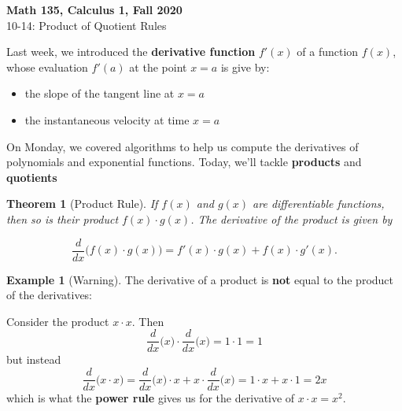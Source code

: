 \documentclass[11pt,reqno,final]{amsart}
\numberwithin{figure}{section}
\newtheorem*{theorem*}{Theorem}%
\theoremstyle{definition} %
\newtheorem{example}[equation]{Example}%
\begin{document}
\begin{center}
        \textbf{\Large Math 135, Calculus 1, Fall 2020}\\[10pt]
        {\large 10-14: Product of Quotient Rules}
\end{center}

\thispagestyle{empty}


\renewcommand{\thesection}{\Alph{section}}


Last week, we introduced the \textbf{derivative function} $f'(x)$ of a function $f(x)$, whose evaluation $f'(a)$ at the point $x=a$ is give by:
\begin{itemize}
\item the slope of the tangent line at $x=a$
\item the instantaneous velocity at time $x = a$
\end{itemize}

On Monday, we covered algorithms to help us compute the derivatives of polynomials and exponential functions.
Today, we'll tackle \textbf{products} and \textbf{quotients}

\begin{theorem*}[Product Rule]
        If $f(x)$ and $g(x)$ are differentiable functions, then so is their product $f(x) \cdot g(x)$.
        The derivative of the product is given by
        \begin{framed}
                \[
                        \dfrac{d}{dx}\Big( f(x) \cdot g(x) \Big) = f'(x) \cdot g(x) + f(x) \cdot g'(x).
                \]
        \end{framed}
\end{theorem*}

\begin{example}[Warning]
        The derivative of a product is \textbf{not} equal to the product of the derivatives:
        
        Consider the product $x \cdot x$. Then
        \[
                \dfrac{d}{dx}\big( x \big) \cdot \dfrac{d}{dx}\big( x \big)
                =
                1 \cdot 1
                =
                1
        \]
        but instead
        \[
                \dfrac{d}{dx}\big(x \cdot x \big) =
                \dfrac{d}{dx}\big(x) \cdot x + x \cdot \dfrac{d}{dx}\big( x \big) =
                1 \cdot x + x \cdot 1 = 2x
        \]
        which is what the \textbf{power rule} gives us for the derivative of $x \cdot x = x^2$.
\end{example}
\end{document}
